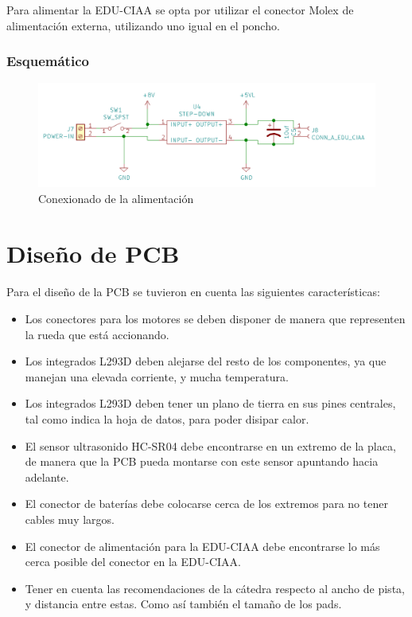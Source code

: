 Para alimentar la EDU-CIAA se opta por utilizar el conector Molex de alimentación externa, utilizando uno
igual en el poncho.

\subsubsection{Esquemático}

\begin{figure}[H]
	\centering
	\includegraphics[width=0.8\linewidth]{informe_3/schem_fuente}
	\caption{Conexionado de la alimentación}
	\label{fig:schemfuente}
\end{figure}


\section{Diseño de PCB}

\paragraph{}Para el diseño de la PCB se tuvieron en cuenta las siguientes características:

\begin{itemize}
	\item Los conectores para los motores se deben disponer de manera que representen la rueda que está accionando.
	\item Los integrados L293D deben alejarse del resto de los componentes, ya que manejan una elevada corriente, y mucha temperatura.
	\item Los integrados L293D deben tener un plano de tierra en sus pines centrales, tal como indica  la hoja de datos, para poder disipar calor.
	\item El sensor ultrasonido HC-SR04 debe encontrarse en un extremo de la placa, de manera que la PCB pueda montarse con este sensor apuntando hacia adelante.
	\item El conector de baterías debe colocarse cerca de los extremos para no tener cables muy largos.
	\item El conector de alimentación para la EDU-CIAA debe encontrarse lo más cerca posible del conector en la EDU-CIAA.
	\item Tener en cuenta las recomendaciones de la cátedra respecto al ancho de pista, y distancia entre estas. Como así también el tamaño de los pads.
\end{itemize}

